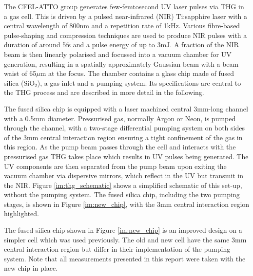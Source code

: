 \documentclass[a4paper]{jpconf}
\begin{document}
The CFEL-ATTO group generates few-femtosecond UV laser pulses via THG in a gas cell. This is driven by a pulsed near-infrared (NIR) Ti:sapphire laser with a central wavelength of 800nm and a repetition rate of 1kHz. Various fibre-based pulse-shaping and compression techniques are used to produce NIR pulses with a duration of around 5fs and a pulse energy of up to 3mJ. A fraction of the NIR beam is then linearly polarised and focussed into a vacuum chamber for UV generation, resulting in a spatially approximately Gaussian beam with a beam waist of 65$\mu$m at the focus. The chamber contains a glass chip made of fused silica (SiO$_2$), a gas inlet and a pumping system. Its specifications are central to the THG process and are described in more detail in the following. \par 
The fused silica chip is equipped with a laser machined central 3mm-long channel with a 0.5mm diameter. Pressurised gas, normally Argon or Neon, is pumped through the channel, with a two-stage differential pumping system on both sides of the 3mm central interaction region ensuring a tight confinement of the gas in this region. As the pump beam passes through the cell and interacts with the pressurised gas THG takes place which results in UV pulses being generated. The UV components are then separated from the pump beam upon exiting the vacuum chamber via dispersive mirrors, which reflect in the UV but transmit in the NIR. Figure \ref{im:thg_schematic} shows a simplified schematic of this set-up, without the pumping system. The fused silica chip, including the two pumping stages, is shown in Figure \ref{im:new_chip}, with the 3mm central interaction region highlighted. \par 
The fused silica chip shown in Figure \ref{im:new_chip} is an improved design on a simpler  cell which was used previously. The old and new cell have the same 3mm central interaction region but differ in their implementation of the pumping system.   Note that all measurements presented in this report were taken with the new chip in place. 
\end{document}
